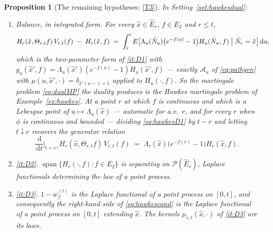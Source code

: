 \documentclass[11pt,a4paper]{article}
\theoremstyle{plain}
\newtheorem{proposition}[theorem]{Proposition}
\theoremstyle{definition}
\theoremstyle{remark}
\newcommand{\Prob}{\mathcal{P}}                %
\newcommand{\dif}{\,\mathrm{d}}
\begin{document}
\begin{proposition}[The remaining hypotheses; \eqref{T3}]
  \label{prop:hawkesDcheck}
  In Setting~\ref{set:hawkesdual}:
  \begin{enumerate}[label=(\alph*)]
  \item \label{it:hd_balance}
    \emph{Balance, in integrated form.}  For every $\hat{x} \in \hat{E}_r$,
    $f \in E_2$ and $r \leq t$,
    \begin{equation}
      \label{eq:hawkesD1}
      H_r(\hat{x},\Theta_{r,t}f)\,V_{r,t}(f) \;-\; H_r(\hat{x},f)
      \;=\; \int_r^t
        E\bigl[ \Lambda_u(\hat{N}_u)\bigl(e^{-f(u)}-1\bigr) H_u(\hat{N}_u,f)
          \bigm| \hat{N}_r = \hat{x} \bigr] \dif u ,
    \end{equation}
    which is the two-parameter form of \ref{it:D1} with
    $g_u(\hat{x}',f) = \Lambda_u(\hat{x}')(e^{-f(u)}-1)H_u(\hat{x}',f)$ ---
    exactly $\mathcal{A}_u$ of \eqref{eq:pathgen} with
    $\mu(u,\hat{x}',\cdot) = \delta_{\hat{x}'(u-)+1}$ applied to
    $H_u(\cdot,f)$.  So the martingale problem \eqref{eq:dualMP} the duality
    produces is the Hawkes martingale problem of Example~\ref{ex:hawkes}.
    At a point $r$ at which $f$ is continuous and which is a Lebesgue point of
    $u \mapsto \Lambda_u(\hat{x})$ --- automatic for a.e.\ $r$, and for every $r$
    when $\phi$ is continuous and bounded --- dividing \eqref{eq:hawkesD1} by
    $t-r$ and letting $t \downarrow r$ recovers the generator relation
    \[
      \frac{\dif}{\dif t}\Big|_{t=r^+}
        H_r(\hat{x},\Theta_{r,t}f) \, V_{r,t}(f)
      \;=\; \Lambda_r(\hat{x}) \bigl( e^{-f(r)} - 1 \bigr) H_r(\hat{x},f) .
    \]
  \item \label{it:hd_sep}
    \emph{\ref{it:D2}.}  $\operatorname{span}\{H_r(\cdot,f) : f \in E_2\}$ is
    separating on $\Prob(\hat{E}_r)$, Laplace functionals determining the law of a
    point process.
  \item \label{it:hd_kernel}
    \emph{\ref{it:D3}.}  $1 - w^{(t)}_f$ is the Laplace functional of a point
    process on $[0,t]$, and consequently the right-hand side of
    \eqref{eq:hawkescond} is the Laplace functional of a point process on $[0,t]$
    extending $\hat{x}$.  The kernels $\mu_{r,t}(\hat{x},\cdot)$ of \ref{it:D3}
    are its laws.
  \end{enumerate}
\end{proposition}
\end{document}
